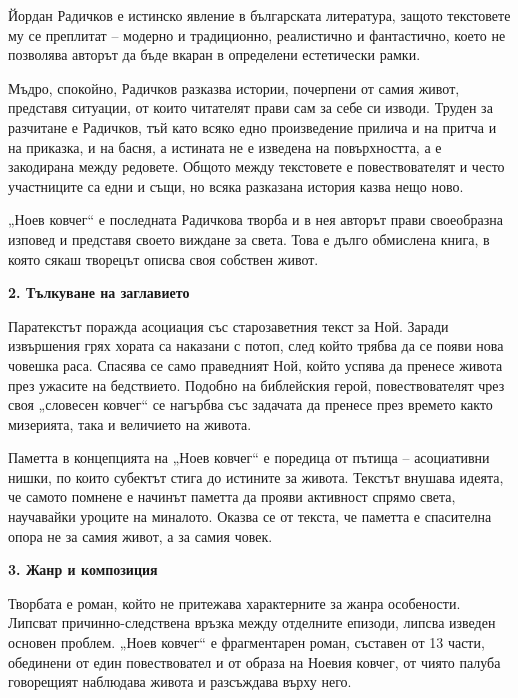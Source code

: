 \documentclass[12pt,a4paper]{article}
\begin{document}
\indent Йордан Радичков е истинско явление в българската литература, защото текстовете му се преплитат – модерно и традиционно, реалистично и фантастично, което не позволява авторът да бъде вкаран в определени естетически рамки.
\vspace{0.1cm}
 
\indent Мъдро, спокойно, Радичков разказва истории, почерпени от самия живот, представя ситуации, от които читателят прави сам за себе си изводи. Труден за разчитане е Радичков, тъй като всяко едно произведение прилича и на притча и на приказка, и на басня, а истината не е изведена на повърхността, а е закодирана между редовете. Общото между текстовете е повествователят и често участниците са едни и същи, но всяка разказана история казва нещо ново.
\vspace{0.1cm}
 
\indent „Ноев ковчег“ е последната Радичкова творба и в нея авторът прави своеобразна изповед и представя своето виждане за света. Това е дълго обмислена книга, в която сякаш творецът описва своя собствен живот.
\vspace{0.1cm}
 
\textbf{2. Тълкуване на заглавието}
\vspace{0.1cm}
  
\indent Паратекстът поражда асоциация със старозаветния текст за Ной. Заради извършения грях хората са наказани с потоп, след който трябва да се появи нова човешка раса. Спасява се само праведният Ной, който успява да пренесе живота през ужасите на бедствието. Подобно на библейския герой, повествователят чрез своя „словесен ковчег“ се нагърбва със задачата да пренесе през времето както мизерията, така и величието на живота.
\vspace{0.1cm}

\indent Паметта в концепцията на „Ноев ковчег“ е поредица от пътища – асоциативни нишки, по които субектът стига до истините за живота. Текстът внушава идеята, че самото помнене е начинът паметта да прояви активност спрямо света, научавайки уроците на миналото. Оказва се от текста, че паметта е спасителна опора не за самия живот, а за самия човек.
\vspace{0.1cm}
 
\textbf{3. Жанр и композиция}
\vspace{0.1cm}
  
\indent Творбата е роман, който не притежава характерните за жанра особености. Липсват причинно-следствена връзка между отделните епизоди, липсва изведен основен проблем. „Ноев ковчег“ е фрагментарен роман, съставен от 13 части, обединени от един повествовател и от образа на Ноевия ковчег, от чиято палуба говорещият наблюдава живота и разсъждава върху него.
\vspace{0.1cm}
\end{document}
